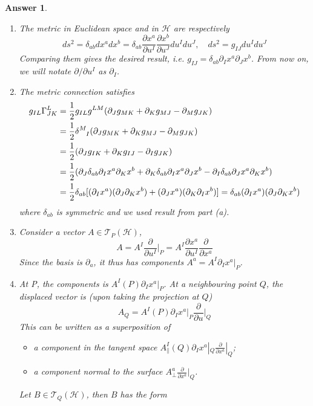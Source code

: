 \documentclass[a4paper]{article}
\theoremstyle{new2}
\newtheorem{ans}{Answer}[section]
\theoremstyle{new}
\begin{document}
\begin{ans}\leavevmode
\begin{enumerate}[label=(\alph*)]
\item The metric in Euclidean space and in $\mathcal{H}$ are respectively
$$ds^2=\delta_{ab}dx^adx^b=\delta_{ab}\frac{\partial x^a}{\partial u^I}\frac{\partial x^b}{\partial u^J}du^Idu^J,\quad ds^2=g_{IJ}du^Idu^J$$
Comparing them gives the desired result, i.e. $g_{IJ}=\delta_{ab}\partial_Ix^a\partial_Jx^b$. From now on, we will notate $\partial/\partial u^I$ as $\partial_I$.
\item The metric connection satisfies
\begin{align}
    g_{IL}\Gamma^L_{JK}&=\frac{1}{2}g_{IL}g^{LM}(\partial_Jg_{MK}+\partial_Kg_{MJ}-\partial_Mg_{JK})\nonumber\\&=\frac{1}{2}\tensor*{\delta}{*_{}^{M}_{I}}(\partial_Jg_{MK}+\partial_Kg_{MJ}-\partial_Mg_{JK})\nonumber\\&=\frac{1}{2}(\partial_Jg_{IK}+\partial_Kg_{IJ}-\partial_Ig_{JK})\nonumber\\&=\frac{1}{2}(\partial_J\delta_{ab}\partial_Ix^a\partial_Kx^b+\partial_K\delta_{ab}\partial_Ix^a\partial_Jx^b-\partial_I\delta_{ab}\partial_Jx^a\partial_Kx^b)\nonumber\\&=\frac{1}{2}\delta_{ab}[(\partial_Ix^a)(\partial_J\partial_Kx^b)+(\partial_Jx^a)(\partial_K\partial_Ix^b)]=\delta_{ab}(\partial_Ix^a)(\partial_J\partial_Kx^b)\nonumber
\end{align}
where $\delta_{ab}$ is symmetric and we used result from part (a).
\item Consider a vector $A\in\mathcal{T}_P(\mathcal{H})$,
$$A=A^I\frac{\partial}{\partial u^I}\bigg|_P=A^I\frac{\partial x^a}{\partial u^I}\frac{\partial}{\partial x^a}$$
Since the basis is $\partial_a$, it thus has components $A^a=A^I\partial_Ix^a|_P$.
\item At P, the components is $A^I(P)\partial_Ix^a|_P$. At a neighbouring point $Q$, the displaced vector is (upon taking the projection at $Q$)
$$A_Q=A^I(P)\partial_Ix^a|_P\frac{\partial}{\partial u}\bigg|_Q$$
This can be written as a superposition of
\begin{itemize}
    \item a component in the tangent space $A_\parallel^I(Q)\partial_Ix^a|_Q\frac{\partial}{\partial x^a}|_Q$;
    \item a component normal to the surface $A^a_\perp\frac{\partial}{\partial x^a}|_Q$.
\end{itemize}
Let $B\in\mathcal{T}_Q(\mathcal{H})$, then $B$ has the form

\end{enumerate}
\end{ans}
\end{document}
